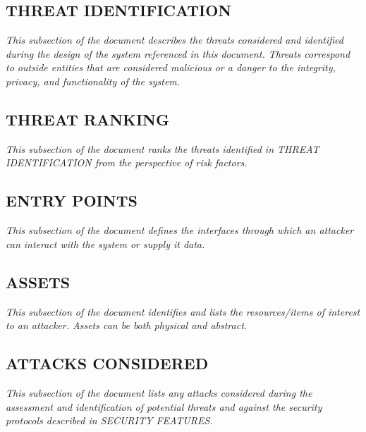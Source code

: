 \documentclass[twoside,letterpaper]{article}
\begin{document}
\subsection{THREAT IDENTIFICATION}
{\itshape\color{black}
This subsection of the document describes the threats
considered and identified during the design of the system referenced
in this document. Threats correspond to outside entities that are considered
malicious or a danger to the integrity, privacy, and functionality of the system. \ }

\subsection{THREAT RANKING}
{\itshape\color{black}
This subsection of the document ranks the threats identified in THREAT IDENTIFICATION
 from the perspective of risk factors. \ }

\subsection{ENTRY POINTS}
{\itshape\color{black}
This subsection of the document defines the interfaces through which an attacker
can interact with the system or supply it data. \ }

\subsection{ASSETS}
{\itshape\color{black}
This subsection of the document identifies and lists the resources/items
of interest to an attacker. Assets can be both physical and abstract. \ }

\subsection{ATTACKS CONSIDERED}
{\itshape\color{black}
This subsection of the document lists any attacks considered during the
assessment and identification of potential threats and against the security
protocols described in SECURITY FEATURES.
\ }
\end{document}
